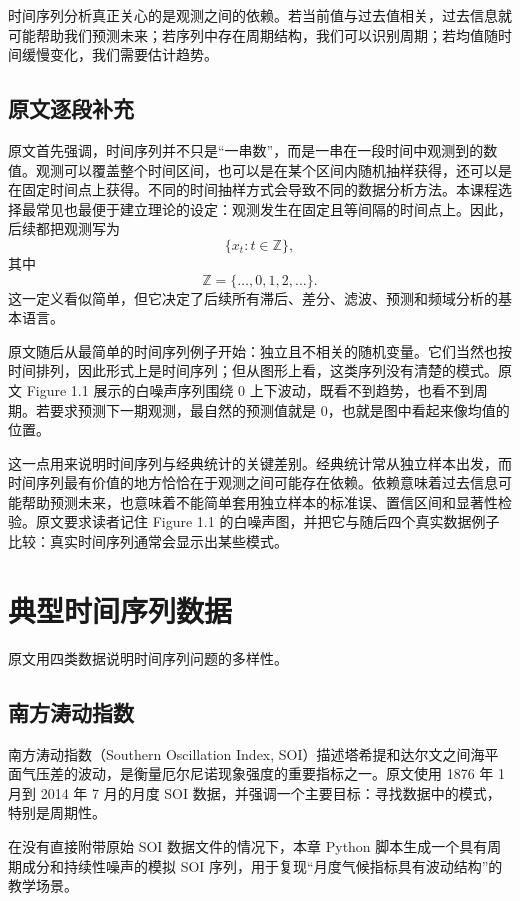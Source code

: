 \documentclass[11pt,a4paper,openany]{ctexbook}
\begin{document}
时间序列分析真正关心的是观测之间的依赖。若当前值与过去值相关，过去信息就可能帮助我们预测未来；若序列中存在周期结构，我们可以识别周期；若均值随时间缓慢变化，我们需要估计趋势。

\subsection{原文逐段补充}

原文首先强调，时间序列并不只是“一串数”，而是一串在一段时间中观测到的数值。观测可以覆盖整个时间区间，也可以是在某个区间内随机抽样获得，还可以是在固定时间点上获得。不同的时间抽样方式会导致不同的数据分析方法。本课程选择最常见也最便于建立理论的设定：观测发生在固定且等间隔的时间点上。因此，后续都把观测写为
\[
  \{x_t:t\in\mathbb Z\},
\]
其中
\[
  \mathbb Z=\{\ldots,0,1,2,\ldots\}.
\]
这一定义看似简单，但它决定了后续所有滞后、差分、滤波、预测和频域分析的基本语言。

原文随后从最简单的时间序列例子开始：独立且不相关的随机变量。它们当然也按时间排列，因此形式上是时间序列；但从图形上看，这类序列没有清楚的模式。原文 Figure 1.1 展示的白噪声序列围绕 0 上下波动，既看不到趋势，也看不到周期。若要求预测下一期观测，最自然的预测值就是 0，也就是图中看起来像均值的位置。

这一点用来说明时间序列与经典统计的关键差别。经典统计常从独立样本出发，而时间序列最有价值的地方恰恰在于观测之间可能存在依赖。依赖意味着过去信息可能帮助预测未来，也意味着不能简单套用独立样本的标准误、置信区间和显著性检验。原文要求读者记住 Figure 1.1 的白噪声图，并把它与随后四个真实数据例子比较：真实时间序列通常会显示出某些模式。

\section{典型时间序列数据}

原文用四类数据说明时间序列问题的多样性。

\subsection{南方涛动指数}

南方涛动指数（Southern Oscillation Index, SOI）描述塔希提和达尔文之间海平面气压差的波动，是衡量厄尔尼诺现象强度的重要指标之一。原文使用 1876 年 1 月到 2014 年 7 月的月度 SOI 数据，并强调一个主要目标：寻找数据中的模式，特别是周期性。

在没有直接附带原始 SOI 数据文件的情况下，本章 Python 脚本生成一个具有周期成分和持续性噪声的模拟 SOI 序列，用于复现“月度气候指标具有波动结构”的教学场景。
\end{document}
